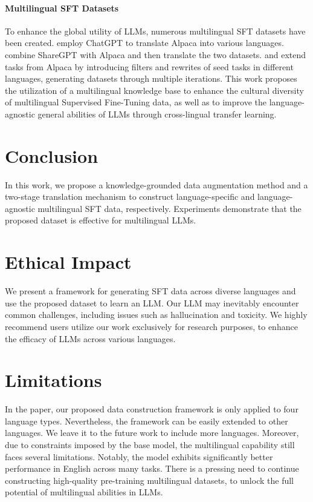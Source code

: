 \documentclass[11pt]{article}
\begin{document}
\paragraph{Multilingual SFT Datasets}
To enhance the global utility of LLMs, numerous multilingual SFT datasets have been created. \citet{okapi} employ ChatGPT to translate Alpaca into various languages. \citet{phoenix} combine ShareGPT with Alpaca and then translate the two datasets. \citet{Guanaco} and \citet{polylm} extend tasks from Alpaca by introducing filters and rewrites of seed tasks in different languages, generating datasets through multiple iterations. This work proposes the utilization of a multilingual knowledge base to enhance the cultural diversity of multilingual Supervised Fine-Tuning data, as well as to improve the language-agnostic general abilities of LLMs through cross-lingual transfer learning.

\section{Conclusion}
In this work, we propose a knowledge-grounded data augmentation method and a two-stage translation mechanism to construct language-specific and language-agnostic multilingual SFT data, respectively.
Experiments demonstrate that the proposed dataset is effective for multilingual LLMs.


\section{Ethical Impact}
We present a framework for generating SFT data across diverse languages and use the proposed dataset to learn an LLM. Our LLM may inevitably encounter common challenges, including issues such as hallucination and toxicity. We highly recommend users utilize our work exclusively for research purposes, to enhance the efficacy of LLMs across various languages.


\section{Limitations}
In the paper, our proposed data construction framework is only applied to four language types. Nevertheless, the framework can be easily extended to other languages. We leave it to the future work to include more languages.
Moreover, due to constraints imposed by the base model, the multilingual capability still faces several limitations. Notably, the model exhibits significantly better performance in English across many tasks. There is a pressing need to continue constructing high-quality pre-training multilingual datasets, to unlock the full potential of multilingual abilities in LLMs.


\end{document}

